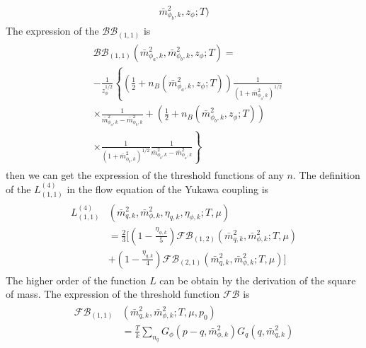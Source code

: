 \documentclass[%
reprint,
superscriptaddress,
showpacs,preprintnumbers,
 amsmath,amssymb,
 aps,
prd,
]{revtex4-1}
\begin{document}
\begin{appendix}
\begin{align}
\begin{split}
\bar{m}^{2}_{\phi_b,k},z_\phi;T)
\end{split}
\end{align} 
The expression of the $\mathcal{BB}_{(1,1)}$ is 
\begin{align}
\begin{split}
&\mathcal{BB}_{(1,1)}(\bar{m}^{2}_{\phi_a,k},\bar{m}^{2}_{\phi_b,k},z_\phi;T)=\\&-\frac{1}{z^{1/2}_{\phi}}\left\{ \left( 
\frac{1}{2}+n_B(\bar{m}^{2}_{\phi_a,k},z_\phi;T) \right)\frac{1}{(1+\bar{m}^{2}_{\phi_a,k})^{1/2}} \right. \\
&\left.\times \frac{1}{\bar{m}^{2}_{\phi_a,k}-\bar{m}^{2}_{\phi_b,k}}+\left( \frac{1}{2}+n_B(\bar{m}^{2}_{\phi_b,k},z_\phi;T) 
\right)\right. \\
&\left.\times \frac{1}{(1+\bar{m}^{2}_{\phi_b,k})^{1/2}}\frac{1}{\bar{m}^{2}_{\phi_b,k}-\bar{m}^{2}_{\phi_a,k}}\right\}
\end{split}
\end{align} 
then we can get the expression of the threshold functions of any $n$.
The definition of the $L^{(4)}_{(1,1)}$ in the flow equation of the Yukawa coupling is
\begin{align}
\begin{split}
L^{(4)}_{(1,1)}&(\bar{m}^{2}_{q,k},\bar{m}^{2}_{\phi,k},\eta_{q,k},\eta_{\phi,k};T,\mu)\\
&=\frac{2}{3}\bigg[(1-\frac{\eta_{\phi,k}}{5})\mathcal{FB}_{(1,2)}(\bar{m}^{2}_{q,k},\bar{m}^{2}_{\phi,k};T,\mu)\\
&+(1-\frac{\eta_{q,k}}{4})\mathcal{FB}_{(2,1)}(\bar{m}^{2}_{q,k},\bar{m}^{2}_{\phi,k};T,\mu)\bigg]
\end{split}
\end{align} 
The higher order of the function $L$ can be obtain by the derivation of the square of mass. The expression of the threshold function $\mathcal{FB}$  
is
\begin{align}
\begin{split}
\mathcal{FB}_{(1,1)}&(\bar{m}^{2}_{q,k},\bar{m}^{2}_{\phi,k};T,\mu,p_0)\\
&=\frac{T}{k}\sum_{n_q}G_{\phi}(p-q,\bar{m}^{2}_{\phi,k})G_q(q,\bar{m}^{2}_{q,k})
\end{split}
\end{align} 




\end{appendix}
\end{document}
